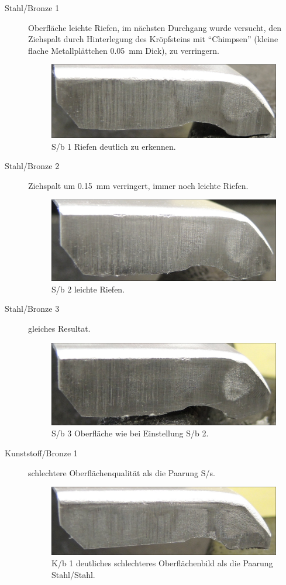 \documentclass[12pt,a4paper,parskip,twoside,BCOR5mm,headsepline]{scrartcl}
\begin{document}
\begin{description*}
\begin{description}
\newpage

\item[Stahl/Bronze 1] Oberfläche leichte Riefen, im nächsten Durchgang wurde versucht,  den Ziehspalt  durch Hinterlegung des Kröpfsteins mit "`Chimpsen"' (kleine flache Metallplättchen  \SI{0.05}{\milli\meter} Dick), zu verringern.
\begin{figure}[H]
\centering
\includegraphics[width=.8\textwidth]{Sb1a}
\caption{S/b 1 Riefen deutlich zu erkennen.}
\label{fig:sb1}
\end{figure}
\item[Stahl/Bronze 2] Ziehspalt um \SI{0.15}{\milli\meter} verringert, immer noch leichte Riefen.
\begin{figure}[H]
\centering
\includegraphics[width=.8\textwidth]{Sb2}
\caption{S/b 2 leichte Riefen. }
\label{sb2}
\end{figure}
\item[Stahl/Bronze 3] gleiches Resultat.
\begin{figure}[H]
\centering
\includegraphics[width=.8\textwidth]{Sb3}
\caption{S/b 3 Oberfläche wie bei Einstellung S/b 2.}
\label{fig:sb3}
\end{figure}

\item[Kunststoff/Bronze 1] schlechtere Oberflächenqualität als die Paarung S/s.
\begin{figure}[H]
\centering
\includegraphics[width=.8\textwidth]{Kb1a}
\caption{K/b 1 deutliches schlechteres Oberflächenbild als die Paarung Stahl/Stahl.}
\label{fig:Kb1a}
\end{figure}


\end{description}
\end{description*}
\end{document}
